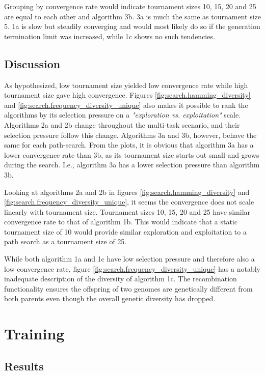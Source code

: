 Grouping by convergence rate would indicate tournament sizes 10, 15, 20 and 25 are equal to each other and algorithm 3b. 3a is much the same as tournament size 5. 1a is slow but steadily converging and would most likely do so if the generation termination limit was increased, while 1c shows no such tendencies. 

\subsection{Discussion}
As hypothesized, low tournament size yielded low convergence rate while high tournament size gave high convergence. Figures \ref{fig:search.hamming_diversity} and \ref{fig:search.frequency_diversity_unique} also makes it possible to rank the algorithms by its selection pressure on a \textit{"exploration vs. exploitation"} scale. Algorithms 2a and 2b change throughout the multi-task scenario, and their selection pressure follow this change. Algorithms 3a and 3b, however, behave the same for each path-search. From the plots, it is obvious that algorithm 3a has a lower convergence rate than 3b, as its tournament size starts out small and grows during the search. I.e., algorithm 3a has a lower selection pressure than algorithm 3b. 

Looking at algorithms 2a and 2b in figures \ref{fig:search.hamming_diversity} and \ref{fig:search.frequency_diversity_unique}, it seems the convergence does not scale linearly with tournament size. Tournament sizes 10, 15, 20 and 25 have similar convergence rate to that of algorithm 1b. This would indicate that a static tournament size of 10 would provide similar exploration and exploitation to a path search as a tournament size of 25. 

While both algorithm 1a and 1c have low selection pressure and therefore also a low convergence rate, figure \ref{fig:search.frequency_diversity_unique} has a notably inadequate description of the diversity of algorithm 1c. The recombination functionality ensures the offspring of two genomes are genetically different from both parents even though the overall genetic diversity has dropped.

\section{Training}

\subsection{Results}


